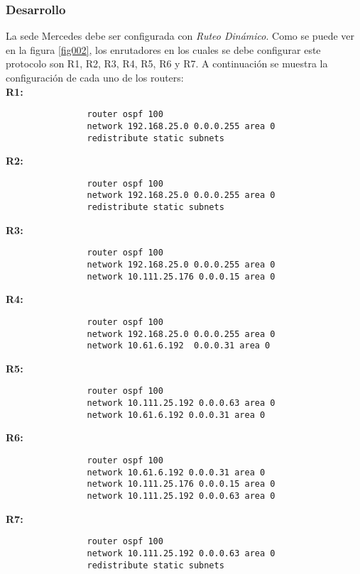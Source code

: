 		\subsubsection{Desarrollo}
			La sede Mercedes debe ser configurada con \textit{Ruteo Dinámico}. Como se puede ver en la figura \ref{fig002}, los enrutadores en los cuales se 
			debe configurar este protocolo son R1, R2, R3, R4, R5, R6 y R7. A continuación se muestra la configuración de cada uno de los routers: \\

			\textbf{R1:}	
			\begin{verbatim}
				router ospf 100
				network 192.168.25.0 0.0.0.255 area 0
				redistribute static subnets
			\end{verbatim}

			\vspace{1cm}
			\textbf{R2:}
			\begin{verbatim}
				router ospf 100
				network 192.168.25.0 0.0.0.255 area 0
				redistribute static subnets
			\end{verbatim}	

			\vspace{1cm}
			\textbf{R3:}
			\begin{verbatim}
				router ospf 100
				network 192.168.25.0 0.0.0.255 area 0
				network 10.111.25.176 0.0.0.15 area 0
			\end{verbatim}	

			\vspace{1cm}
			\textbf{R4:}
			\begin{verbatim}
				router ospf 100
				network 192.168.25.0 0.0.0.255 area 0
				network 10.61.6.192  0.0.0.31 area 0
			\end{verbatim}	

			\vspace{1cm}
			\textbf{R5:}
			\begin{verbatim}
				router ospf 100
				network 10.111.25.192 0.0.0.63 area 0
				network 10.61.6.192 0.0.0.31 area 0
			\end{verbatim}	

			\vspace{1cm}
			\textbf{R6:}
			\begin{verbatim}
				router ospf 100
				network 10.61.6.192 0.0.0.31 area 0
				network 10.111.25.176 0.0.0.15 area 0
				network 10.111.25.192 0.0.0.63 area 0
			\end{verbatim}	

			\vspace{1cm}
			\textbf{R7:}
			\begin{verbatim}
				router ospf 100
				network 10.111.25.192 0.0.0.63 area 0
				redistribute static subnets
			\end{verbatim}	
